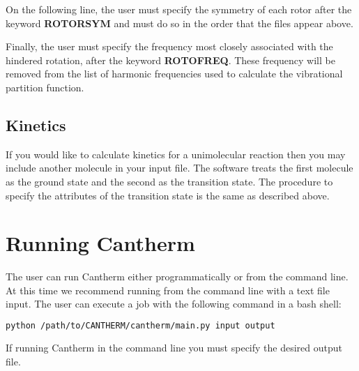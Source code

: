 \documentclass[a4paper,12pt]{article}
\begin{document}
On the following line, the user must specify the symmetry of each rotor after the keyword \textbf{ROTORSYM} and must do so in the order that the files appear above.

Finally, the user must specify the frequency most closely associated with the hindered rotation, after the keyword \textbf{ROTOFREQ}. These frequency will be removed from the list of harmonic frequencies used to calculate the vibrational partition function.

\subsection{Kinetics}
If you would like to calculate kinetics for a unimolecular reaction then you may include another molecule in your input file. The software treats the first molecule as the ground state and the second as the transition state. The procedure to specify the attributes of the transition state is the same as described above.

\section{Running Cantherm}
The user can run Cantherm either programmatically or from the command line. At this time we recommend running from the command line with a text file input. The user can execute a job with the following command in a bash shell:

\begin{lstlisting}[language=bash]
python /path/to/CANTHERM/cantherm/main.py input output
\end{lstlisting}

If running Cantherm in the command line you must specify the desired output file.
\end{document}
